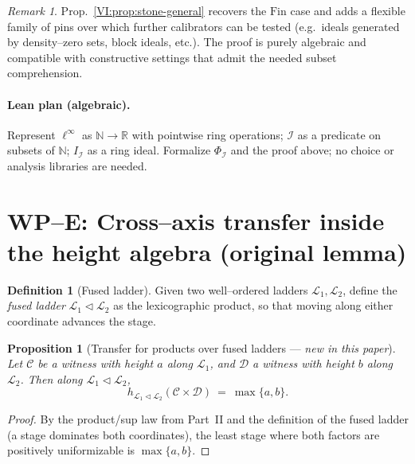 \documentclass[11pt]{article}
\newtheorem{proposition}[theorem]{Proposition}
\theoremstyle{definition}
\newtheorem{definition}[theorem]{Definition}
\theoremstyle{remark}
\newtheorem{remark}[theorem]{Remark}
\newcommand{\linf}{\ell^\infty}
\begin{document}
\begin{remark}
Prop.~\ref{VI:prop:stone-general} recovers the \(\mathrm{Fin}\) case and adds a flexible family of pins over which further calibrators can be tested (e.g.\ ideals generated by density–zero sets, block ideals, etc.). The proof is purely algebraic and compatible with constructive settings that admit the needed subset comprehension.
\end{remark}

\paragraph{Lean plan (algebraic).}
Represent \(\linf\) as \(\mathbb N\to \mathbb R\) with pointwise ring operations; \(\mathcal I\) as a predicate on subsets of \(\mathbb N\); \(I_{\mathcal I}\) as a ring ideal. Formalize \(\Phi_{\mathcal I}\) and the proof above; no choice or analysis libraries are needed.

\section{WP–E: Cross–axis transfer inside the height algebra (original lemma)}

\begin{definition}[Fused ladder]
Given two well–ordered ladders \(\mathcal L_1,\mathcal L_2\), define the \emph{fused ladder}
\(\mathcal L_1\triangleleft\mathcal L_2\) as the lexicographic product, so that moving along either coordinate advances the stage.
\end{definition}

\begin{proposition}[Transfer for products over fused ladders — \emph{new in this paper}]\label{VI:prop:transfer}
Let \(\mathcal C\) be a witness with height \(a\) along \(\mathcal L_1\), and \(\mathcal D\) a witness with height \(b\) along \(\mathcal L_2\).
Then along \(\mathcal L_1\triangleleft\mathcal L_2\),
\[
h_{\mathcal L_1\triangleleft\mathcal L_2}(\mathcal C\times \mathcal D)\ =\ \max\{a,b\}.
\]
\end{proposition}

\begin{proof}
By the product/sup law from Part~II and the definition of the fused ladder (a stage dominates both coordinates), the least stage where both factors are positively uniformizable is \(\max\{a,b\}\).
\end{proof}
\end{document}
